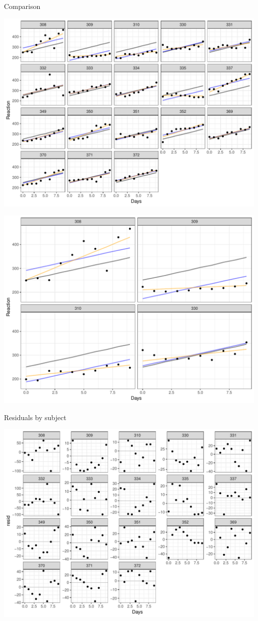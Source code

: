 \documentclass[11pt,ignorenonframetext,]{beamer}
\begin{document}
\begin{frame}{Comparison}

\includegraphics{Lec5_files/figure-beamer/unnamed-chunk-35-1.pdf}

\end{frame}

\begin{frame}{}

\includegraphics{Lec5_files/figure-beamer/unnamed-chunk-36-1.pdf}

\end{frame}

\begin{frame}{Residuals by subject}

\includegraphics{Lec5_files/figure-beamer/unnamed-chunk-37-1.pdf}

\end{frame}
\end{document}
